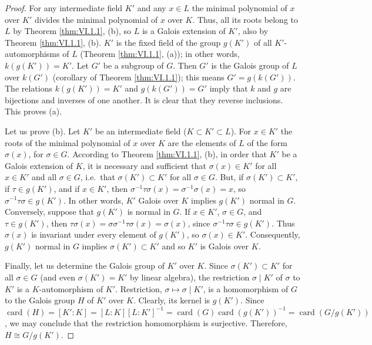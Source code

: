 \begin{proof}
For any intermediate field $K'$ and any $x\in L$ the minimal polynomial of
$x$ over $K'$ divides the minimal polynomial of $x$ over $K$. Thus, all
its roots belong to $L$ by Theorem \ref{thm:VI.1.1}, (b), so $L$ is a
Galois extension of $K'$, also by Theorem \ref{thm:VI.1.1}, (b). $K'$ is
the fixed field of the group $g(K')$ of all $K'$-automorphisms of $L$
(Theorem \ref{thm:VI.1.1}, (a)); in other words, $k(g(K'))=K'$. Let $G'$
be a subgroup of $G$. Then $G'$ is the Galois group of $L$ over $k(G')$
(corollary of Theorem \ref{thm:VI.1.1}); this means $G'=g(k(G'))$. The
relations $k(g(K'))=K'$ and $g(k(G'))=G'$ imply that $k$ and $g$ are
bijections and inverses of one another. It is clear that they reverse
inclusions. This proves (a).

Let us prove (b). Let $K'$ be an intermediate field
($K\subset K'\subset L$). For $x\in K'$ the roots of the minimal polynomial
of $x$ over $K$ are the elements of $L$ of the form $\sigma(x)$, for
$\sigma\in G$. According to Theorem \ref{thm:VI.1.1}, (b), in order that
$K'$ be a Galois extension of $K$, it is necessary and sufficient that
$\sigma(x)\in K'$ for all $x\in K'$ and all $\sigma\in G$, i.e.\ that
$\sigma(K')\subset K'$ for all $\sigma\in G$. But, if
$\sigma(K')\subset K'$, if $\tau\in g(K')$, and if $x\in K'$, then
$\sigma^{-1}\tau\sigma(x)=\sigma^{-1}\sigma(x)=x$, so
$\sigma^{-1}\tau\sigma\in g(K')$. In other words, $K'$ Galois over $K$
implies $g(K')$ normal in $G$. Conversely, suppose that $g(K')$ is normal
in $G$. If $x\in K'$, $\sigma\in G$, and $\tau\in g(K')$, then
$\tau\sigma(x)=\sigma\sigma^{-1}\tau\sigma(x)=\sigma(x)$, since
$\sigma^{-1}\tau\sigma\in g(K')$. Thus $\sigma(x)$ is invariant under
every element of $g(K')$, so $\sigma(x)\in K'$. Consequently, $g(K')$
normal in $G$ implies $\sigma(K')\subset K'$ and so $K'$ is Galois over
$K$.

Finally, let us determine the Galois group of $K'$ over $K$. Since
$\sigma(K')\subset K'$ for all $\sigma\in G$ (and even $\sigma(K')=K'$ by
linear algebra), the restriction $\sigma\mid K'$ of $\sigma$ to $K'$ is a
$K$-automorphism of $K'$. Restriction, $\sigma\mapsto\sigma\mid K'$, is a
homomorphism of $G$ to the Galois group $H$ of $K'$ over $K$. Clearly, its
kernel is $g(K')$. Since
$\operatorname{card}(H)=[K':K]=[L:K][L:K']^{-1}
=\operatorname{card}(G)\operatorname{card}(g(K'))^{-1}
=\operatorname{card}(G/g(K'))$, we may conclude that the restriction
homomorphism is surjective. Therefore, $H\cong G/g(K')$.
\end{proof}


